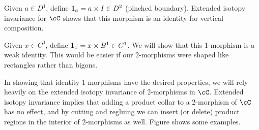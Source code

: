 Given $a\in D^1$, define $\boldsymbol{1}_a = a\times I \in D^2$ (pinched boundary).
Extended isotopy invariance for $\cC$ shows that this morphism is an identity for 
vertical composition.

Given $x\in C^0$, define $\boldsymbol{1}_x = x\times B^1 \in C^1$.
We will show that this 1-morphism is a weak identity.
This would be easier if our 2-morphisms were shaped like rectangles rather than bigons.

In showing that identity 1-morphisms have the desired properties, we will
rely heavily on the extended isotopy invariance of 2-morphisms in $\cC$.
Extended isotopy invariance implies that adding a product collar to a 2-morphism of $\cC$ has no effect,
and by cutting and regluing we can insert (or delete) product regions in the interior of 2-morphisms as well.
Figure  shows some examples.



